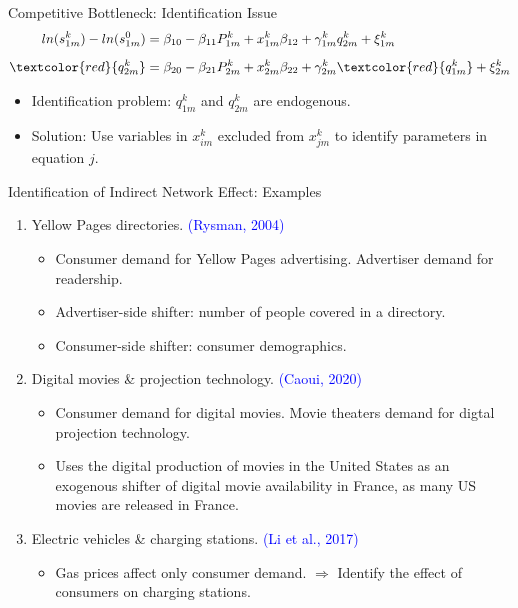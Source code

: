 \documentclass[aspectratio=169]{beamer}  %
\begin{document}
\begin{frame}{Competitive Bottleneck: Identification Issue}
    \vspace{-1.5cm}
    \begin{align*}
        ln(s_{1m}^{k}) - ln(s_{1m}^{0}) &= \beta_{10} - \beta_{11}P_{1m}^{k} + x_{1m}^{k}\beta_{12} + \gamma_{1m}^{k}q_{2m}^{k} + \xi_{1m}^{k} \\[5pt]
        \textcolor{red}{q_{2m}^{k}} &= \beta_{20} - \beta_{21}P_{2m}^{k} + x_{2m}^{k}\beta_{22} + \gamma_{2m}^{k}\textcolor{red}{q_{1m}^{k}} + \xi_{2m}^{k}
    \end{align*}
    \vspace{-0.5cm}
    \begin{itemize}
        \item Identification problem: $q_{1m}^{k}$ and $q_{2m}^{k}$ are endogenous.
        \item Solution: Use variables in $x_{im}^{k}$ excluded from $x^{k}_{jm}$ to identify parameters in equation $j$.
    \end{itemize}
\end{frame}

\begin{frame}{Identification of Indirect Network Effect: Examples}
    \begin{enumerate}
        \item Yellow Pages directories. \textcolor{blue}{(Rysman, 2004)}
        \begin{itemize}
            \item Consumer demand for Yellow Pages advertising. Advertiser demand for readership.
            \item Advertiser-side shifter: number of people covered in a directory.
            \item Consumer-side shifter: consumer demographics.
        \end{itemize}
        \vspace{0.1cm}

        \item Digital movies \& projection technology. \textcolor{blue}{(Caoui, 2020)}
        \begin{itemize}
            \item Consumer demand for digital movies. Movie theaters demand for digtal projection technology.
            \item Uses the digital production of movies in the United States as an exogenous shifter of digital movie availability in France, as many US movies are released in France.
        \end{itemize}
        \vspace{0.1cm}

        \item Electric vehicles \& charging stations. \textcolor{blue}{(Li et al., 2017)}
        \begin{itemize}
            \item Gas prices affect only consumer demand. $\Rightarrow$ Identify
            the effect of consumers on charging stations.
        \end{itemize}
    \end{enumerate}
\end{frame}
\end{document}
